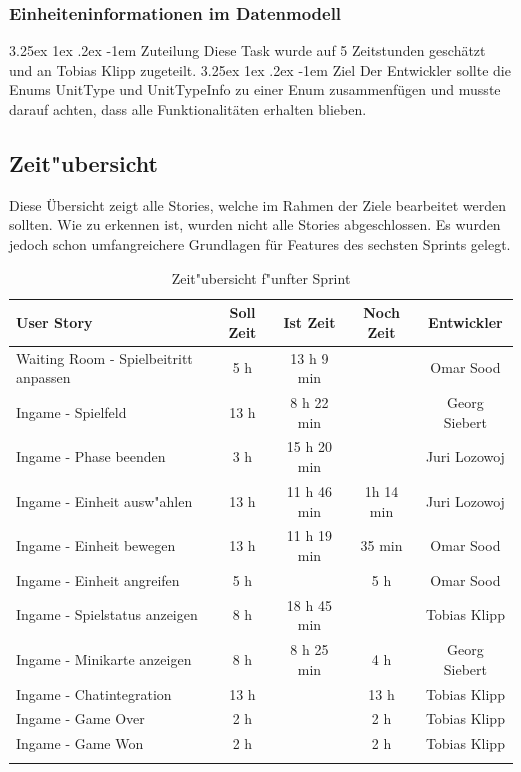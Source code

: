 \documentclass[12pt, titlepage]{scrartcl}
\makeatletter
\renewcommand\paragraph{\@startsection{paragraph}{5}{\z@}%
  {3.25ex \@plus1ex \@minus.2ex}%
  {-1em}%
  {\normalfont\normalsize\bfseries}}
\makeatother
\begin{document}
            \subsubsection{Einheiteninformationen im Datenmodell} \label{task_unit_properties}
            	\paragraph{Zuteilung}
            		Diese Task wurde auf 5 Zeitstunden gesch\"atzt und an Tobias Klipp zugeteilt.
            	\paragraph{Ziel}
            		Der Entwickler sollte die Enums UnitType und UnitTypeInfo zu einer Enum zusammenf\"ugen und musste darauf achten, dass alle Funktionalit\"aten erhalten blieben.
        \subsection{Zeit"ubersicht}
        	Diese \"Ubersicht zeigt alle Stories, welche im Rahmen der Ziele bearbeitet werden sollten. Wie zu erkennen ist, wurden nicht alle Stories abgeschlossen. Es wurden jedoch schon umfangreichere Grundlagen f\"ur Features des sechsten Sprints gelegt.
        	\begin{longtable}[H]{p{6cm} c c c c }
        			\label{Time_1}
       				\textbf{User Story} & \textbf{Soll Zeit} & \textbf{Ist Zeit} & \textbf{Noch Zeit} & \textbf{Entwickler} \\
       				\toprule
       				\endhead
       				Waiting Room - Spielbeitritt anpassen & 5 h & 13 h 9 min &  & Omar Sood\\
       				Ingame - Spielfeld & 13 h & 8 h 22 min &  & Georg Siebert\\
       				Ingame - Phase beenden & 3 h & 15 h 20 min &  & Juri Lozowoj \\
       				Ingame - Einheit ausw"ahlen & 13 h & 11 h 46 min & 1h 14 min & Juri Lozowoj \\
       				Ingame - Einheit bewegen & 13 h & 11 h 19 min & 35 min & Omar Sood \\
       				Ingame - Einheit angreifen & 5 h &  & 5 h & Omar Sood \\
       				Ingame - Spielstatus anzeigen & 8 h & 18 h 45 min &  & Tobias Klipp \\
       				Ingame - Minikarte anzeigen & 8 h & 8 h 25 min & 4 h & Georg Siebert \\
       				Ingame - Chatintegration & 13 h &  & 13 h & Tobias Klipp \\
       				Ingame - Game Over & 2 h &  & 2 h & Tobias Klipp \\
       				Ingame - Game Won & 2 h &  & 2 h & Tobias Klipp \\
        			\caption{Zeit"ubersicht f"unfter Sprint}
        	\end{longtable}
\end{document}
